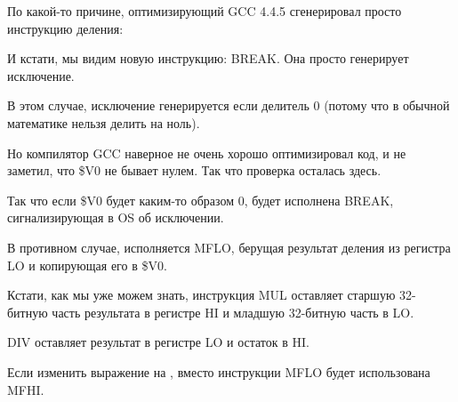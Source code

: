 ﻿

По какой-то причине, оптимизирующий GCC 4.4.5 сгенерировал просто инструкцию деления:




И кстати, мы видим новую инструкцию: BREAK. Она просто генерирует исключение.

В этом случае, исключение генерируется если делитель 0 (потому что в обычной математике нельзя
делить на ноль).

Но компилятор GCC наверное не очень хорошо оптимизировал код, и не заметил, что \$V0 не бывает нулем.
Так что проверка осталась здесь.

Так что если \$V0 будет каким-то образом 0, будет исполнена BREAK, сигнализирующая в \ac{OS} 
об исключении.

В противном случае, исполняется MFLO, берущая результат деления из регистра LO и копирующая его в \$V0.


Кстати, как мы уже можем знать, инструкция MUL оставляет старшую 32-битную часть результата
в регистре HI и младшую 32-битную часть в LO.

DIV оставляет результат в регистре LO и остаток в HI.

Если изменить выражение на , вместо инструкции MFLO будет использована MFHI.
